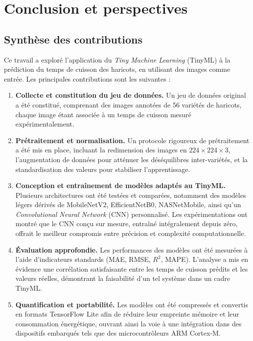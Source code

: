 \chapter{Conclusion et perspectives}
\label{chap:conclusion}

\section{Synthèse des contributions}
\label{sec:synthese_contributions}

Ce travail a exploré l'application du \textit{Tiny Machine Learning} (TinyML) à la prédiction du temps de cuisson des haricots, en utilisant des images comme entrée. Les principales contributions sont les suivantes :

\begin{enumerate}
    \item \textbf{Collecte et constitution du jeu de données.} Un jeu de données original a été constitué, comprenant des images annotées de 56 variétés de haricots, chaque image étant associée à un temps de cuisson mesuré expérimentalement.
    \item \textbf{Prétraitement et normalisation.} Un protocole rigoureux de prétraitement a été mis en place, incluant la redimension des images en \(224 \times 224 \times 3\), l'augmentation de données pour atténuer les déséquilibres inter-variétés, et la standardisation des valeurs pour stabiliser l'apprentissage.
    \item \textbf{Conception et entraînement de modèles adaptés au TinyML.} Plusieurs architectures ont été testées et comparées, notamment des modèles légers dérivés de MobileNetV2, EfficientNetB0, NASNetMobile, ainsi qu'un \textit{Convolutional Neural Network} (CNN) personnalisé. Les expérimentations ont montré que le CNN conçu sur mesure, entraîné intégralement depuis zéro, offrait le meilleur compromis entre précision et complexité computationnelle.
    \item \textbf{Évaluation approfondie.} Les performances des modèles ont été mesurées à l'aide d'indicateurs standards (MAE, RMSE, \(R^2\), MAPE). L'analyse a mis en évidence une corrélation satisfaisante entre les temps de cuisson prédits et les valeurs réelles, démontrant la faisabilité d'un tel système dans un cadre TinyML.
    \item \textbf{Quantification et portabilité.} Les modèles ont été compressés et convertis en formats TensorFlow Lite afin de réduire leur empreinte mémoire et leur consommation énergétique, ouvrant ainsi la voie à une intégration dans des dispositifs embarqués tels que des microcontrôleurs ARM Cortex-M.
\end{enumerate}

